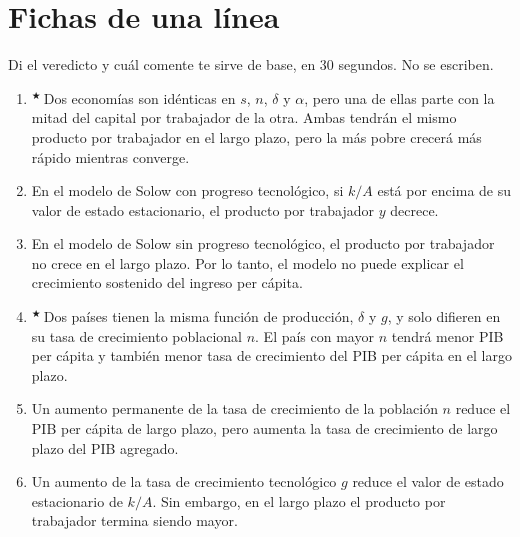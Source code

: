 \documentclass[12pt,letterpaper]{article}
\newif\ifpauta
\newcommand{\ficha}[1]{\ifpauta\par{\small$\Rightarrow$\ #1}\fi}
\newcommand{\estrella}{$^\bigstar$\,}
\begin{document}
\section*{Fichas de una línea}
{\small Di el veredicto y cuál comente te sirve de base, en 30 segundos. No se escriben.}
\begin{enumerate}[label=F\arabic*.,leftmargin=2.2em,itemsep=0.4em]
\item \estrella Dos economías son idénticas en $s$, $n$, $\delta$ y $\alpha$, pero una de ellas parte con la mitad del capital por trabajador de la otra. Ambas tendrán el mismo producto por trabajador en el largo plazo, pero la más pobre crecerá más rápido mientras converge.
\ficha{\textbf{V} · base 11: mismo $k^*$; la pobre tiene más brecha en el gráfico de tasas. Es convergencia entre economías con los mismos parámetros.}
\item En el modelo de Solow con progreso tecnológico, si $k/A$ está por encima de su valor de estado estacionario, el producto por trabajador $y$ decrece.
\ficha{\textbf{I} · base 12: $\dot y/y=g+\alpha\,\dot{\tilde k}/\tilde k<g$; solo decrece si $\alpha|\dot{\tilde k}/\tilde k|>g$ (muy lejos del EE).}
\item En el modelo de Solow sin progreso tecnológico, el producto por trabajador no crece en el largo plazo. Por lo tanto, el modelo no puede explicar el crecimiento sostenido del ingreso per cápita.
\ficha{\textbf{V} · base 14: en el EE, $g_y=\alpha g_k=0$ por la $PMgK$ decreciente; $g$ es exógeno, y eso motiva el modelo de Romer.}
\item \estrella Dos países tienen la misma función de producción, $\delta$ y $g$, y solo difieren en su tasa de crecimiento poblacional $n$. El país con mayor $n$ tendrá menor PIB per cápita y también menor tasa de crecimiento del PIB per cápita en el largo plazo.
\ficha{\textbf{F} · base 15: la 1.ª parte es V ($\tilde y^*$ menor, recta $\delta+n+g$ más alta), pero $g_y=g$ en ambos: nivel, no tasa.}
\item Un aumento permanente de la tasa de crecimiento de la población $n$ reduce el PIB per cápita de largo plazo, pero aumenta la tasa de crecimiento de largo plazo del PIB agregado.
\ficha{\textbf{V} · bases 14 y 15: $\tilde y^*$ baja, pero $g_Y=n+g$ sube.}
\item Un aumento de la tasa de crecimiento tecnológico $g$ reduce el valor de estado estacionario de $k/A$. Sin embargo, en el largo plazo el producto por trabajador termina siendo mayor.
\ficha{\textbf{V} · base 14: $\tilde k^*$ baja (nivel), pero $y(t)=A(0)e^{gt}\tilde y^*$ y domina el crecimiento.}

\end{enumerate}
\end{document}
